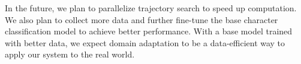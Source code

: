 \documentclass{article}
\begin{document}
\begin{multicols*}{2}
In the future, we plan to parallelize trajectory search to speed up computation. We also plan to collect more data and further fine-tune the base character classification model to achieve better performance. With a base model trained with better data, we expect domain adaptation to be a data-efficient way to apply our system to the real world. 








\clearpage





\end{multicols*}
\end{document}
